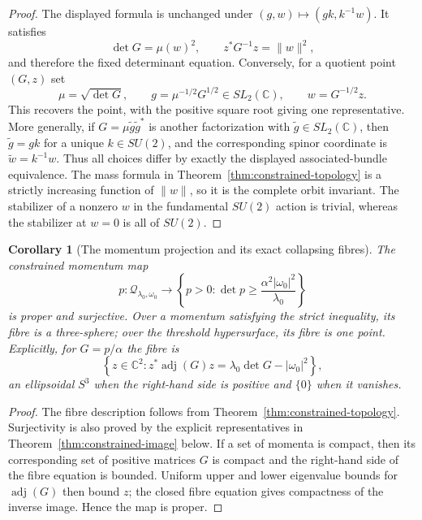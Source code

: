 \documentclass[11pt]{article}
\newtheorem{corollary}[theorem]{Corollary}
\theoremstyle{definition}
\newcommand{\C}{\mathbb C}
\newcommand{\adj}{\operatorname{adj}}
\newcommand{\cQ}{\mathscr Q}
\begin{document}
\begin{proof}
The displayed formula is unchanged under
$(g,w)\mapsto(gk,k^{-1}w)$.  It satisfies
\[
 \det G=\mu(w)^2,
 \qquad
 z^*G^{-1}z=\|w\|^2,
\]
and therefore the fixed determinant equation.  Conversely, for a quotient
point $(G,z)$ set
\[
 \mu=\sqrt{\det G},
 \qquad
 g=\mu^{-1/2}G^{1/2}\in SL_2(\C),
 \qquad
 w=G^{-1/2}z.
\]
This recovers the point, with the positive square root giving one
representative.  More generally, if
$G=\mu\widetilde g\widetilde g^*$ is another factorization with
$\widetilde g\in SL_2(\C)$, then $\widetilde g=gk$ for a unique
$k\in SU(2)$, and the corresponding spinor coordinate is
$\widetilde w=k^{-1}w$.  Thus all choices differ by exactly the displayed
associated-bundle equivalence.  The mass formula in
Theorem~\ref{thm:constrained-topology} is a strictly increasing function of
$\|w\|$, so it is the complete orbit invariant.  The stabilizer of a nonzero
$w$ in the fundamental $SU(2)$ action is trivial, whereas the stabilizer at
$w=0$ is all of $SU(2)$.
\end{proof}

\begin{corollary}[The momentum projection and its exact collapsing fibres]\label{cor:momentum-fibres}
The constrained momentum map
\[
 p:\cQ_{\lambda_0,\omega_0}\longrightarrow
 \left\{p>0:\det p\geq
 \frac{\alpha^2|\omega_0|^2}{\lambda_0}\right\}
\]
is proper and surjective.  Over a momentum satisfying the strict inequality,
its fibre is a three-sphere; over the threshold hypersurface, its fibre is one
point.  Explicitly, for $G=p/\alpha$ the fibre is
\[
 \left\{z\in\C^2:
 z^*\adj(G)z=\lambda_0\det G-|\omega_0|^2\right\},
\]
an ellipsoidal $S^3$ when the right-hand side is positive and $\{0\}$ when it
vanishes.
\end{corollary}

\begin{proof}
The fibre description follows from Theorem~\ref{thm:constrained-topology}.
Surjectivity is also proved by the explicit representatives in
Theorem~\ref{thm:constrained-image} below.  If a set of momenta is compact,
then its corresponding set of positive matrices $G$ is compact and the
right-hand side of the fibre equation is bounded.  Uniform upper and lower
eigenvalue bounds for $\adj(G)$ then bound $z$; the closed fibre equation gives
compactness of the inverse image.  Hence the map is proper.
\end{proof}
\end{document}
